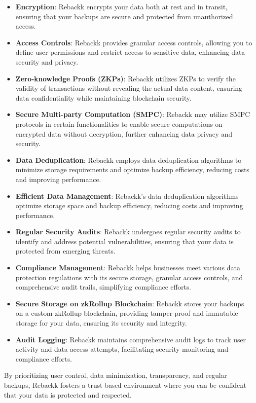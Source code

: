 \documentclass[12pt]{article}
\begin{document}
\begin{itemize}
    \item \textbf{Encryption}: Rebackk encrypts your data both at rest and in transit, ensuring that your backups are secure and protected from unauthorized access.
    \item \textbf{Access Controls}: Rebackk provides granular access controls, allowing you to define user permissions and restrict access to sensitive data, enhancing data security and privacy.
    \item \textbf{Zero-knowledge Proofs (ZKPs)}: Rebackk utilizes ZKPs to verify the validity of transactions without revealing the actual data content, ensuring data confidentiality while maintaining blockchain security.
    \item \textbf{Secure Multi-party Computation (SMPC)}: Rebackk may utilize SMPC protocols in certain functionalities to enable secure computations on encrypted data without decryption, further enhancing data privacy and security.
    \item \textbf{Data Deduplication}: Rebackk employs data deduplication algorithms to minimize storage requirements and optimize backup efficiency, reducing costs and improving performance.
    \item \textbf{Efficient Data Management}: Rebackk's data deduplication algorithms optimize storage space and backup efficiency, reducing costs and improving performance.
    \item \textbf{Regular Security Audits}: Rebackk undergoes regular security audits to identify and address potential vulnerabilities, ensuring that your data is protected from emerging threats.
    \item \textbf{Compliance Management}: Rebackk helps businesses meet various data protection regulations with its secure storage, granular access controls, and comprehensive audit trails, simplifying compliance efforts.
    \item \textbf{Secure Storage on zkRollup Blockchain}: Rebackk stores your backups on a custom zkRollup blockchain, providing tamper-proof and immutable storage for your data, ensuring its security and integrity.
    \item \textbf{Audit Logging}: Rebackk maintains comprehensive audit logs to track user activity and data access attempts, facilitating security monitoring and compliance efforts.
\end{itemize}

By prioritizing user control, data minimization, transparency, and regular backups, Rebackk fosters a trust-based environment where you can be confident that your data is protected and respected. 
\end{document}
